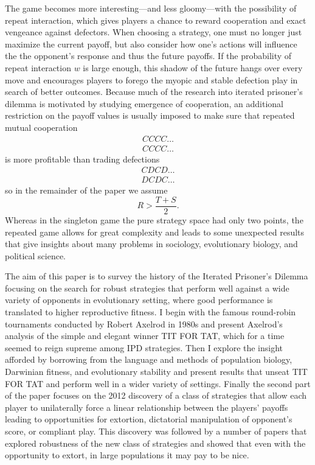 The game becomes more interesting---and less gloomy---with the possibility of repeat interaction, which gives players a chance to reward cooperation and exact vengeance against defectors. When choosing a strategy, one must no longer just maximize the current payoff, but also consider how one's actions will influence the the opponent's response and thus the future payoffs. If the probability of repeat interaction $w$ is large enough, this shadow of the future hangs over every move and encourages players to forego the myopic and stable defection play in search of better outcomes. Because much of the research into iterated prisoner's dilemma is motivated by studying emergence of cooperation, an additional restriction on the payoff values is usually imposed to make sure that repeated mutual cooperation
\[
\begin{array}{c}
CCCC\dots \\
CCCC\dots
\end{array}
\]
is more profitable than trading defections
\[
\begin{array}{c}
CDCD\dots \\
DCDC\dots
\end{array}
\]
so in the remainder of the paper we assume
\[
R > \frac{T+S}{2}
.\]
Whereas in the singleton game the pure strategy space had only two points, the repeated game allows for great complexity and leads to some unexpected results that give insights about many problems in sociology, evolutionary biology, and political science.

The aim of this paper is to survey the history of the Iterated Prisoner's Dilemma focusing on the search for robust strategies that perform well against a wide variety of opponents in evolutionary setting, where good performance is translated to higher reproductive fitness. I begin with the famous round-robin tournaments conducted by Robert Axelrod in 1980s and present Axelrod's analysis of the simple and elegant winner TIT FOR TAT, which for a time seemed to reign supreme among IPD strategies. Then I explore the insight afforded by borrowing from the language and methods of population biology, Darwinian fitness, and evolutionary stability and present results that unseat TIT FOR TAT and perform well in a wider variety of settings. Finally the second part of the paper focuses on the 2012 discovery of a class of strategies that allow each player to unilaterally force a linear relationship between the players' payoffs leading to opportunities for extortion, dictatorial manipulation of opponent's score, or compliant play. This discovery was followed by a number of papers that explored robustness of the new class of strategies and showed that even with the opportunity to extort, in large populations it may pay to be nice.


